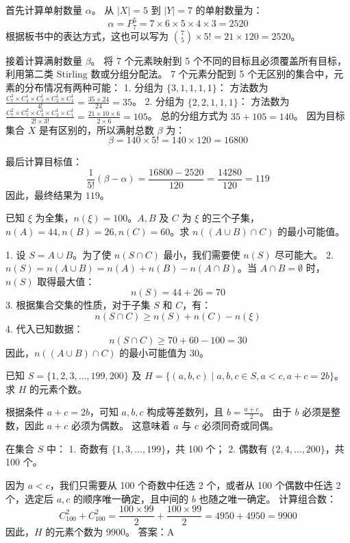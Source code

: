 \begin{questions}
\begin{solution}
首先计算单射数量 $\alpha$。
从 $|X|=5$ 到 $|Y|=7$ 的单射数量为：
\[
\alpha = P_7^5 = 7 \times 6 \times 5 \times 4 \times 3 = 2520
\]
根据板书中的表达方式，这也可以写为 $\binom{7}{5} \times 5! = 21 \times 120 = 2520$。

接着计算满射数量 $\beta$。
将 7 个元素映射到 5 个不同的目标且必须覆盖所有目标，利用第二类 Stirling 数或分组分配法。
7 个元素分配到 5 个无区别的集合中，元素的分布情况有两种可能：
1. 分组为 $\{3, 1, 1, 1, 1\}$：
方法数为 $\frac{C_7^3 \times C_4^1 \times C_3^1 \times C_2^1 \times C_1^1}{4!} = \frac{35 \times 24}{24} = 35$。
2. 分组为 $\{2, 2, 1, 1, 1\}$：
方法数为 $\frac{C_7^2 \times C_5^2 \times C_3^1 \times C_2^1 \times C_1^1}{2! \times 3!} = \frac{21 \times 10 \times 6}{2 \times 6} = 105$。
总的分组方式为 $35 + 105 = 140$。
因为目标集合 $X$ 是有区别的，所以满射总数 $\beta$ 为：
\[
\beta = 140 \times 5! = 140 \times 120 = 16800
\]

最后计算目标值：
\[
\frac{1}{5!} (\beta - \alpha) = \frac{16800 - 2520}{120} = \frac{14280}{120} = 119
\]
因此，最终结果为 $119$。
\end{solution}

\question 已知 $\xi$ 为全集，$n(\xi)=100$。$A, B$ 及 $C$ 为 $\xi$ 的三个子集，$n(A)=44, n(B)=26, n(C)=60$。求 $n((A \cup B) \cap C)$ 的最小可能值。

\begin{solution}
1. 设 $S = A \cup B$。为了使 $n(S \cap C)$ 最小，我们需要使 $n(S)$ 尽可能大。
2. $n(S) = n(A \cup B) = n(A) + n(B) - n(A \cap B)$。当 $A \cap B = \emptyset$ 时，$n(S)$ 取得最大值：
\[ n(S) = 44 + 26 = 70 \]
3. 根据集合交集的性质，对于子集 $S$ 和 $C$，有：
\[ n(S \cap C) \ge n(S) + n(C) - n(\xi) \]
4. 代入已知数据：
\[ n(S \cap C) \ge 70 + 60 - 100 = 30 \]
因此，$n((A \cup B) \cap C)$ 的最小可能值为 30。
\end{solution}

\question
已知 $S = \{1, 2, 3, \dots, 199, 200\}$ 及 $H = \{(a, b, c) \mid a, b, c \in S, a < c, a + c = 2b\}$。求 $H$ 的元素个数。

\begin{solution}
根据条件 $a + c = 2b$，可知 $a, b, c$ 构成等差数列，且 $b = \frac{a+c}{2}$。
由于 $b$ 必须是整数，因此 $a + c$ 必须为偶数。
这意味着 $a$ 与 $c$ 必须同奇或同偶。

在集合 $S$ 中：
1. 奇数有 $\{1, 3, \dots, 199\}$，共 100 个；
2. 偶数有 $\{2, 4, \dots, 200\}$，共 100 个。

因为 $a < c$，我们只需要从 100 个奇数中任选 2 个，或者从 100 个偶数中任选 2 个，选定后 $a, c$ 的顺序唯一确定，且中间的 $b$ 也随之唯一确定。
计算组合数：
\[ C_{100}^{2} + C_{100}^{2} = \frac{100 \times 99}{2} + \frac{100 \times 99}{2} = 4950 + 4950 = 9900 \]
因此，$H$ 的元素个数为 9900。
答案：A
\end{solution}


\end{questions}
